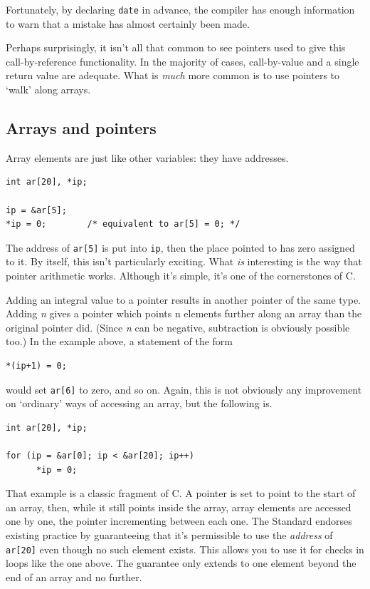    Fortunately, by declaring \texttt{date} in advance, the compiler
    has enough information to warn that a mistake has almost certainly been
    made.


   Perhaps surprisingly, it isn't all that common to see pointers used to
    give this call-by-reference functionality. In the majority of cases,
    call-by-value and a single return value are adequate. What is
    \textit{much} more common is to use pointers to `walk' along
    arrays.


  

  \subsection{Arrays and pointers}\label{subsec:arrPtr}
   

   Array elements are just like other variables: they have addresses.


   \begin{Verbatim}
int ar[20], *ip;

ip = &ar[5];
*ip = 0;        /* equivalent to ar[5] = 0; */
\end{Verbatim}

   The address of \texttt{ar[5]} is put into \texttt{ip}, then
    the place pointed to has zero assigned to it. By itself, this isn't
    particularly exciting. What \textit{is} interesting is the way that
    pointer arithmetic works. Although it's simple, it's one of the
    cornerstones of C.


   Adding an integral value to a pointer results in another pointer of
    the same type. Adding \textit{n} gives a pointer which points n elements
    further along an array than the original pointer did. (Since \textit{n}
    can be negative, subtraction is obviously possible too.) In the example
    above, a statement of the form


   \begin{Verbatim}
*(ip+1) = 0;
\end{Verbatim}

   would set \texttt{ar[6]} to zero, and so on. Again, this is not
    obviously any improvement on `ordinary' ways of accessing an
    array, but the following is.


   \begin{Verbatim}
int ar[20], *ip;

for (ip = &ar[0]; ip < &ar[20]; ip++)
      *ip = 0;
\end{Verbatim}

   That example is a classic fragment of C. A pointer is set to
    point to the start of an array, then, while it still points inside the
    array, array elements are accessed one by one, the pointer incrementing
    between each one. The Standard endorses existing practice by
    guaranteeing that it's permissible to use the \textit{address} of
    \texttt{ar[20]} even though no such element exists. This allows you
    to use it for checks in loops like the one above. The guarantee only
    extends to one element beyond the end of an array and no further.


